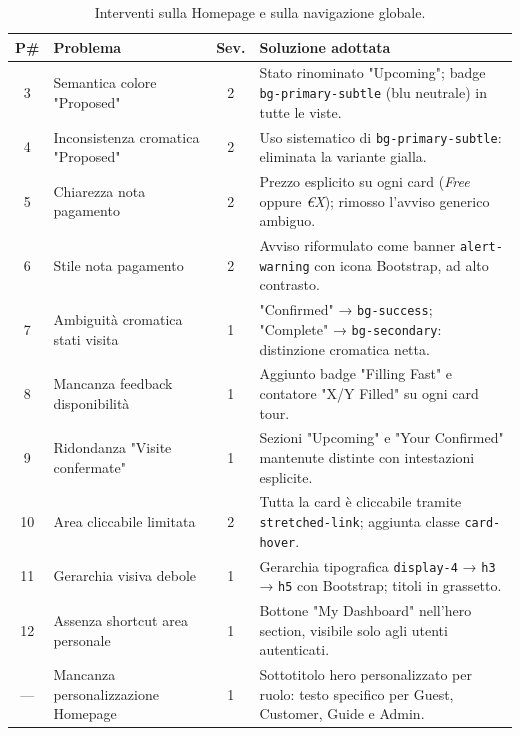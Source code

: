 \begin{table}[H]
\centering
\renewcommand{\arraystretch}{1.4}
\small
\begin{tabularx}{\textwidth}{|c|X|c|X|}
\hline
\textbf{P\#} & \textbf{Problema} & \textbf{Sev.} & \textbf{Soluzione adottata} \\ \hline
3  & Semantica colore "Proposed"        & 2 & Stato rinominato "Upcoming"; badge \texttt{bg-primary-subtle} (blu neutrale) in tutte le viste. \\ \hline
4  & Inconsistenza cromatica "Proposed" & 2 & Uso sistematico di \texttt{bg-primary-subtle}: eliminata la variante gialla. \\ \hline
5  & Chiarezza nota pagamento           & 2 & Prezzo esplicito su ogni card (\textit{Free} oppure \textit{€X}); rimosso l'avviso generico ambiguo. \\ \hline
6  & Stile nota pagamento               & 2 & Avviso riformulato come banner \texttt{alert-warning} con icona Bootstrap, ad alto contrasto. \\ \hline
7  & Ambiguità cromatica stati visita   & 1 & "Confirmed" → \texttt{bg-success}; "Complete" → \texttt{bg-secondary}: distinzione cromatica netta. \\ \hline
8  & Mancanza feedback disponibilità    & 1 & Aggiunto badge "Filling Fast" e contatore "X/Y Filled" su ogni card tour. \\ \hline
9  & Ridondanza "Visite confermate"     & 1 & Sezioni "Upcoming" e "Your Confirmed" mantenute distinte con intestazioni esplicite. \\ \hline
10 & Area cliccabile limitata           & 2 & Tutta la card è cliccabile tramite \texttt{stretched-link}; aggiunta classe \texttt{card-hover}. \\ \hline
11 & Gerarchia visiva debole            & 1 & Gerarchia tipografica \texttt{display-4} → \texttt{h3} → \texttt{h5} con Bootstrap; titoli in grassetto. \\ \hline
12 & Assenza shortcut area personale    & 1 & Bottone "My Dashboard" nell'hero section, visibile solo agli utenti autenticati. \\ \hline
—  & Mancanza personalizzazione Homepage & 1 & Sottotitolo hero personalizzato per ruolo: testo specifico per Guest, Customer, Guide e Admin. \\ \hline
\end{tabularx}
\caption{Interventi sulla Homepage e sulla navigazione globale.}
\label{tab:fix_home}
\end{table}

